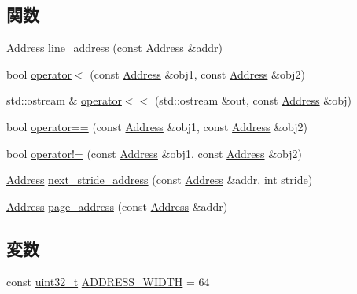 \subsection*{関数}
\begin{DoxyCompactItemize}
\item 
\hyperlink{classAddress}{Address} \hyperlink{Address_8hh_abe46a2cc64664e1a3a02d0a501e4f21d}{line\_\-address} (const \hyperlink{classAddress}{Address} \&addr)
\item 
bool \hyperlink{Address_8hh_a89baa7226ba91f27a54feb1d4fdbfff9}{operator$<$} (const \hyperlink{classAddress}{Address} \&obj1, const \hyperlink{classAddress}{Address} \&obj2)
\item 
std::ostream \& \hyperlink{Address_8hh_a23e54ef4a14e8ac62c034d786463d167}{operator$<$$<$} (std::ostream \&out, const \hyperlink{classAddress}{Address} \&obj)
\item 
bool \hyperlink{Address_8hh_ad0cb56c920b72501175cf194c5624980}{operator==} (const \hyperlink{classAddress}{Address} \&obj1, const \hyperlink{classAddress}{Address} \&obj2)
\item 
bool \hyperlink{Address_8hh_aec2dc78d4294b4b41e21213912217910}{operator!=} (const \hyperlink{classAddress}{Address} \&obj1, const \hyperlink{classAddress}{Address} \&obj2)
\item 
\hyperlink{classAddress}{Address} \hyperlink{Address_8hh_a4e1398eb42e200863179d5ae0c90a715}{next\_\-stride\_\-address} (const \hyperlink{classAddress}{Address} \&addr, int stride)
\item 
\hyperlink{classAddress}{Address} \hyperlink{Address_8hh_a5169a800da4ecad8ccc7eb6731094ef7}{page\_\-address} (const \hyperlink{classAddress}{Address} \&addr)
\end{DoxyCompactItemize}
\subsection*{変数}
\begin{DoxyCompactItemize}
\item 
const \hyperlink{Type_8hh_a435d1572bf3f880d55459d9805097f62}{uint32\_\-t} \hyperlink{Address_8hh_aa4ec36f84d22eb1b4ccaf88f057dbd5e}{ADDRESS\_\-WIDTH} = 64
\end{DoxyCompactItemize}


